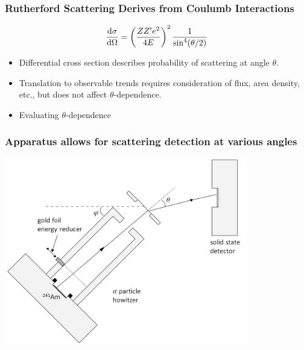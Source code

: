 \documentclass{beamer}
\begin{document}
\begin{frame}
  \frametitle{Rutherford Scattering Derives from Coulumb Interactions}
  \begin{equation*}
    \dv{\sigma}{\Omega} = \left( \frac{Z Z' e^2}{4E}\right)^2 \frac{1}{\sin^4 (\theta/2)}
  \end{equation*}

  \begin{itemize}
    \item Differential cross section describes probability of scattering at angle $\theta$.
    \item Translation to observable trends requires consideration of flux, area density, etc., but does not affect $\theta$-dependence.
    \item Evaluating $\theta$-dependence 
  \end{itemize}
\end{frame}

\begin{frame}
  \frametitle{Apparatus allows for scattering detection at various angles}
  \includegraphics[width=0.8\textwidth]{apparatus}
\end{frame}
\end{document}
